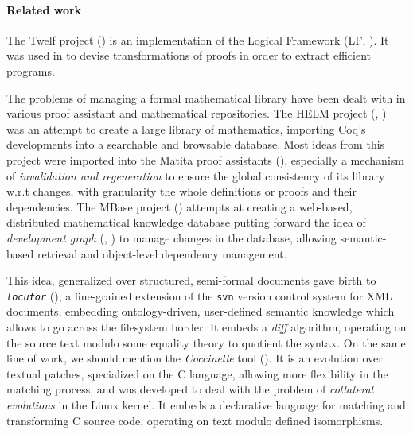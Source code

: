 \documentclass{article}
\begin{document}


\paragraph{Related work}
\label{rw}

The \textsf{Twelf} project (\cite{pfenning1999system}) is an
implementation of the Logical Framework (LF,
\cite{harper1993framework}). It was used in \cite{anderson1993program}
to devise transformations of proofs in order to extract efficient
programs.

The problems of managing a formal mathematical library have been dealt
with in various proof assistant and mathematical repositories. The
HELM project (\cite{asperti2000content}, \cite{asperti2006content})
was an attempt to create a large library of mathematics, importing
\textsf{Coq}'s developments into a searchable and browsable database.
Most ideas from this project were imported into the \textsf{Matita}
proof assistants (\cite{asperti2007hop}), especially a mechanism of
\emph{invalidation and regeneration} to ensure the global consistency
of its library w.r.t changes, with granularity the whole definitions
or proofs and their dependencies. The MBase project
(\cite{kohlhase2001mbase}) attempts at creating a web-based,
distributed mathematical knowledge database putting forward the idea
of \emph{development graph} (\cite{hutter2000management},
\cite{autexier2000towards}) to manage changes in the database,
allowing semantic-based retrieval and object-level dependency
management.

This idea, generalized over structured, semi-formal documents gave
birth to \texttt{\it locutor} (\cite{muller2008fine}), a fine-grained
extension of the \texttt{svn} version control system for XML
documents, embedding ontology-driven, user-defined semantic knowledge
which allows to go across the filesystem border. It embeds a
\emph{diff} algorithm, operating on the source text modulo some
equality theory to quotient the syntax. On the same line of work, we
should mention the \emph{Coccinelle} tool
(\cite{padioleau2008documenting}). It is an evolution over textual
patches, specialized on the C language, allowing more flexibility in
the matching process, and was developed to deal with the problem of
\emph{collateral evolutions} in the Linux kernel. It embeds a
declarative language for matching and transforming C source code,
operating on text modulo defined isomorphisms.
\end{document}
